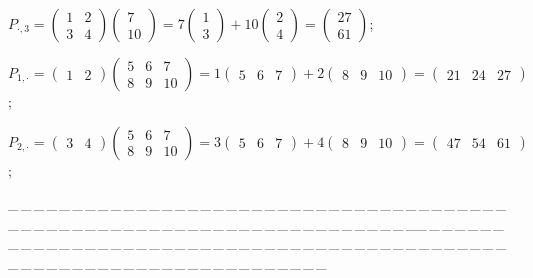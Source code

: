 \documentclass[a4paper, 11pt, UTF8]{article}
\begin{document}
\begin{large}
\par\quad
$P_{\cdot,3}=\begin{pmatrix} 1 & 2\\ 3 & 4\end{pmatrix}\begin{pmatrix} 7 \\ 10\end{pmatrix}=7\begin{pmatrix}1\\3\end{pmatrix}+10\begin{pmatrix}2\\4\end{pmatrix}=\begin{pmatrix} 27\\ 61\end{pmatrix}$;
\par\quad
$P_{1,\cdot}=\begin{pmatrix} 1 & 2\end{pmatrix}\begin{pmatrix} 5 & 6 & 7 \\ 8 & 9 & 10\end{pmatrix}=1\begin{pmatrix} 5 & 6 & 7\end{pmatrix}+2\begin{pmatrix}8 & 9 & 10\end{pmatrix}=\begin{pmatrix} 21 & 24 & 27\end{pmatrix}$;
\par\quad
$P_{2,\cdot}=\begin{pmatrix} 3 & 4\end{pmatrix}\begin{pmatrix} 5 & 6 & 7 \\ 8 & 9 & 10\end{pmatrix}=3\begin{pmatrix} 5 & 6 & 7\end{pmatrix}+4\begin{pmatrix}8 & 9 & 10\end{pmatrix}=\begin{pmatrix} 47 & 54 & 61\end{pmatrix}$;
\par
{\tiny \_\,\_\,\_\,\_\,\_\,\_\,\_\,\_\,\_\,\_\,\_\,\_\,\_\,\_\,\_\,\_\,\_\,\_\,\_\,\_\,\_\,\_\,\_\,\_\,\_\,\_\,\_\,\_\,\_\,\_\,\_\,\_\,\_\,\_\,\_\,\_\,\_\,\_\,\_\,\_\,\_\,\_\,\_\,\_\,\_\,\_\,\_\,\_\,\_\,\_\,\_\,\_\,\_\,\_\,\_\,\_\,\_\,\_\,\_\,\_\,\_\,\_\,\_\,\_\,\_\,\_\,\_\,\_\,\_\,\_\,\_\_\,\_\,\_\,\_\,\_\,\_\,\_\,\_\,\_\,\_\,\_\,\_\,\_\,\_\,\_\,\_\,\_\,\_\,\_\,\_\,\_\,\_\,\_\,\_\,\_\,\_\,\_\,\_\,\_\,\_\,\_\,\_\,\_\,\_\,\_\,\_\,\_\,\_\,\_\,\_\,\_\,\_\,\_\,\_\,\_\,\_\,\_\,\_\,\_\,\_\,\_\,\_\,\_\,\_\,\_\,\_\,\_\,\_\,\_\,\_\,\_\,\_\,\_\,\_\,\_\,\_\,\_\,\_\,\_\,\_\,\_}\par

\end{large}
\end{document}
